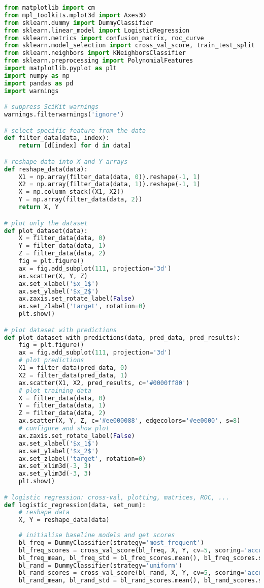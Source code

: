 \documentclass[12pt]{article}
\begin{document}
\lstset{basicstyle=\footnotesize}
\begin{lstlisting}[language=Python]
from matplotlib import cm
from mpl_toolkits.mplot3d import Axes3D
from sklearn.dummy import DummyClassifier
from sklearn.linear_model import LogisticRegression
from sklearn.metrics import confusion_matrix, roc_curve
from sklearn.model_selection import cross_val_score, train_test_split
from sklearn.neighbors import KNeighborsClassifier
from sklearn.preprocessing import PolynomialFeatures
import matplotlib.pyplot as plt
import numpy as np
import pandas as pd
import warnings

# suppress SciKit warnings
warnings.filterwarnings('ignore')

# select specific feature from the data
def filter_data(data, index):
    return [d[index] for d in data]

# reshape data into X and Y arrays
def reshape_data(data):
    X1 = np.array(filter_data(data, 0)).reshape(-1, 1)
    X2 = np.array(filter_data(data, 1)).reshape(-1, 1)
    X = np.column_stack((X1, X2))
    Y = np.array(filter_data(data, 2))
    return X, Y

# plot only the dataset
def plot_dataset(data):
    X = filter_data(data, 0)
    Y = filter_data(data, 1)
    Z = filter_data(data, 2)
    fig = plt.figure()
    ax = fig.add_subplot(111, projection='3d')
    ax.scatter(X, Y, Z)
    ax.set_xlabel('$x_1$')
    ax.set_ylabel('$x_2$')
    ax.zaxis.set_rotate_label(False)
    ax.set_zlabel('target', rotation=0)
    plt.show()

# plot dataset with predictions
def plot_dataset_with_predictions(data, pred_data, pred_results):
    fig = plt.figure()
    ax = fig.add_subplot(111, projection='3d')
    # plot predictions
    X1 = filter_data(pred_data, 0)
    X2 = filter_data(pred_data, 1)
    ax.scatter(X1, X2, pred_results, c='#0000ff80')
    # plot training data
    X = filter_data(data, 0)
    Y = filter_data(data, 1)
    Z = filter_data(data, 2)
    ax.scatter(X, Y, Z, c='#ee000088', edgecolors='#ee0000', s=8)
    # configure and show plot
    ax.zaxis.set_rotate_label(False)
    ax.set_xlabel('$x_1$')
    ax.set_ylabel('$x_2$')
    ax.set_zlabel('target', rotation=0)
    ax.set_xlim3d(-3, 3)
    ax.set_ylim3d(-3, 3)
    plt.show()

# logistic regression: cross-val, plotting, matrices, ROC, ...
def logistic_regression(data, set_num):
    # reshape data
    X, Y = reshape_data(data)
    
    # initialise baseline models and get scores
    bl_freq = DummyClassifier(strategy='most_frequent')
    bl_freq_scores = cross_val_score(bl_freq, X, Y, cv=5, scoring='accuracy')
    bl_freq_mean, bl_freq_std = bl_freq_scores.mean(), bl_freq_scores.std()
    bl_rand = DummyClassifier(strategy='uniform')
    bl_rand_scores = cross_val_score(bl_rand, X, Y, cv=5, scoring='accuracy')
    bl_rand_mean, bl_rand_std = bl_rand_scores.mean(), bl_rand_scores.std()
    

\end{lstlisting}
\end{document}
